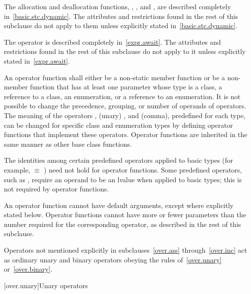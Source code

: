 \pnum
The allocation and deallocation functions,
,
,
and
,
are described completely in~\ref{basic.stc.dynamic}.
The attributes and restrictions
found in the rest of this subclause do not apply to them unless explicitly
stated in~\ref{basic.stc.dynamic}.

\pnum
The  operator is described completely in~\ref{expr.await}.
The attributes and restrictions
found in the rest of this subclause do not apply to it unless explicitly
stated in~\ref{expr.await}.

\pnum
{}%
An operator function
shall either be a non-static member function or be a non-member function that
has at least one parameter whose type is a class, a reference to a class, an
enumeration, or a reference to an enumeration.
It is not possible to change the precedence, grouping, or number of operands
of operators.
The meaning of the operators
\tcode{=},
(unary)
\tcode{\&},
and
\tcode{,}
(comma), predefined for each type, can be changed for specific
class and enumeration types by
defining operator functions that implement these operators.
%
Operator functions are inherited in the same manner as other base class
functions.

\pnum
{}%
The identities among certain predefined operators applied to basic types
(for example,
 $\equiv$
)
need not hold for operator functions.
Some predefined operators, such as
\tcode{+=},
require an operand to be an lvalue when applied to basic types;
this is not required by operator functions.

\pnum
{}%
An operator function cannot have default arguments,
except where explicitly stated below.
Operator
functions cannot have more or fewer parameters than the
number required for the corresponding operator, as
described in the rest of this subclause.

\pnum
Operators not mentioned explicitly in subclauses~\ref{over.ass} through~\ref{over.inc}
act as ordinary unary and binary
operators obeying the rules of~\ref{over.unary} or~\ref{over.binary}.%
%

[over.unary]{Unary operators}%
%

